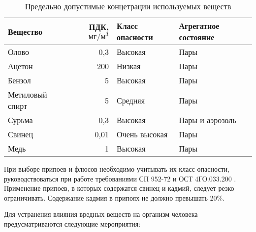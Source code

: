 \begin{table}[ht]
    \centering
    \begin{tabular}{l|r|l|l}
        Вещество    & ПДК, $\text{мг}/\text{м}^3$   & Класс опасности   & Агрегатное состояние  \\ \hline
        Олово       & 0,3                           & Высокая           & Пары                  \\
        Ацетон      & 200                           & Низкая            & Пары                  \\
        Бензол      & 5                             & Высокая           & Пары                  \\
        Метиловый спирт & 5                         & Средняя           & Пары                  \\
        Сурьма      & 0,3                           & Высокая           & Пары и аэрозоль       \\
        Свинец      & 0,01                          & Очень высокая     & Пары                  \\
        Медь        & 1                             & Высокая           & Пары                  \\ \hline
    \end{tabular}
    \caption{Предельно допустимые концетрации используемых веществ}
    \label{assembly_pdk}
\end{table}

При выборе припоев и флюсов необходимо учитывать их класс опасности, руководствоваться
при работе требованиями СП 952-72 \cite{ecology_san_norm_925_72} и ОСТ 4ГО.033.200
\cite{ecology_ost_033_200}. Применение припоев, в которых содержатся свинец и
кадмий, следует резко ограничивать. Содержание кадмия в припоях не должно превышать 20\%.

Для устранения влияния вредных веществ на организм человека предусматриваются
следующие мероприятия:

